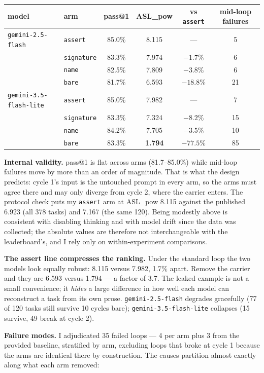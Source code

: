 \documentclass[10pt]{article}
\newcommand{\code}[1]{\texttt{\small #1}}
\begin{document}
\begin{center}\small
\begin{tabular}{llcccc}
\toprule
model & arm & pass@1 & ASL\_pow & vs \code{assert} & mid-loop failures \\
\midrule
\code{gemini-2.5-flash} & \code{assert} & 85.0\% & 8.115 & --- & 5 \\
 & \code{signature} & 83.3\% & 7.974 & $-1.7\%$ & 6 \\
 & \code{name} & 82.5\% & 7.809 & $-3.8\%$ & 6 \\
 & \code{bare} & 81.7\% & 6.593 & $-18.8\%$ & 21 \\
\midrule
\code{gemini-3.5-flash-lite} & \code{assert} & 85.0\% & 7.982 & --- & 7 \\
 & \code{signature} & 83.3\% & 7.324 & $-8.2\%$ & 15 \\
 & \code{name} & 84.2\% & 7.705 & $-3.5\%$ & 10 \\
 & \code{bare} & 83.3\% & \textbf{1.794} & $\mathbf{-77.5\%}$ & 85 \\
\bottomrule
\end{tabular}
\end{center}

\textbf{Internal validity.} pass@1 is flat across arms (81.7--85.0\%) while
mid-loop failures move by more than an order of magnitude. That is what the
design predicts: cycle 1's input is the untouched prompt in every arm, so the
arms must agree there and may only diverge from cycle 2, where the carrier
enters. The protocol check puts my \code{assert} arm at ASL\_pow 8.115 against
the published 6.923 (all 378 tasks) and 7.167 (the same 120). Being modestly
above is consistent with disabling thinking and with model drift since the data
was collected; the absolute values are therefore not interchangeable with the
leaderboard's, and I rely only on within-experiment comparisons.

\textbf{The assert line compresses the ranking.} Under the standard loop the
two models look equally robust: 8.115 versus 7.982, 1.7\% apart. Remove the
carrier and they are 6.593 versus 1.794 --- a factor of 3.7. The leaked example
is not a small convenience; it \emph{hides} a large difference in how well each
model can reconstruct a task from its own prose. \code{gemini-2.5-flash}
degrades gracefully (77 of 120 tasks still survive 10 cycles bare);
\code{gemini-3.5-flash-lite} collapses (15 survive, 49 break at cycle 2).

\textbf{Failure modes.} I adjudicated 35 failed loops --- 4 per arm plus 3 from
the provided baseline, stratified by arm, excluding loops that broke at cycle 1
because the arms are identical there by construction. The causes partition
almost exactly along what each arm removed:
\end{document}
